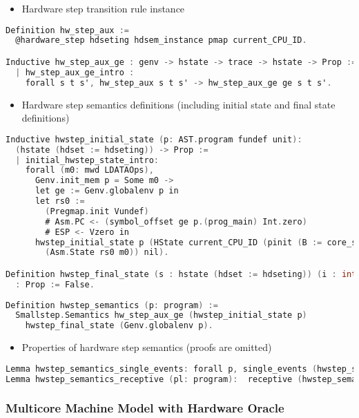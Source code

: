 \begin{itemize}[leftmargin=*]
\item Hardware step transition rule instance
\end{itemize}
\begin{lstlisting}[language=C]
Definition hw_step_aux :=
  @hardware_step hdseting hdsem_instance pmap current_CPU_ID.

Inductive hw_step_aux_ge : genv -> hstate -> trace -> hstate -> Prop :=
  | hw_step_aux_ge_intro : 
    forall s t s', hw_step_aux s t s' -> hw_step_aux_ge ge s t s'.
\end{lstlisting}

\begin{itemize}[leftmargin=*]
\item Hardware step semantics definitions (including initial state and final state definitions)
\end{itemize}
\begin{lstlisting}[language=C]    
Inductive hwstep_initial_state (p: AST.program fundef unit): 
  (hstate (hdset := hdseting)) -> Prop := 
  | initial_hwstep_state_intro: 
    forall (m0: mwd LDATAOps),
      Genv.init_mem p = Some m0 ->
      let ge := Genv.globalenv p in
      let rs0 :=
        (Pregmap.init Vundef)
        # Asm.PC <- (symbol_offset ge p.(prog_main) Int.zero)
        # ESP <- Vzero in
      hwstep_initial_state p (HState current_CPU_ID (pinit (B := core_set)
        (Asm.State rs0 m0)) nil).

Definition hwstep_final_state (s : hstate (hdset := hdseting)) (i : int) 
  : Prop := False.
      
Definition hwstep_semantics (p: program) :=
  Smallstep.Semantics hw_step_aux_ge (hwstep_initial_state p) 
    hwstep_final_state (Genv.globalenv p).
\end{lstlisting}
    
\begin{itemize}[leftmargin=*]
\item Properties of hardware step semantics (proofs are omitted)
\end{itemize}
\begin{lstlisting}[language=C]    
Lemma hwstep_semantics_single_events: forall p, single_events (hwstep_semantics p).
Lemma hwstep_semantics_receptive (pl: program):  receptive (hwstep_semantics pl).
\end{lstlisting}

\subsubsection{Multicore Machine Model with Hardware Oracle}

